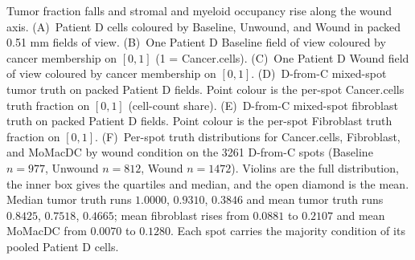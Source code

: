 Tumor fraction falls and stromal and myeloid occupancy rise along the wound axis. (A)~Patient D cells coloured by Baseline, Unwound, and Wound in packed 0.51 mm fields of view. (B)~One Patient D Baseline field of view coloured by cancer membership on \([0,1]\) (1 = Cancer.cells). (C)~One Patient D Wound field of view coloured by cancer membership on \([0,1]\). (D)~D-from-C mixed-spot tumor truth on packed Patient D fields. Point colour is the per-spot Cancer.cells truth fraction on \([0,1]\) (cell-count share). (E)~D-from-C mixed-spot fibroblast truth on packed Patient D fields. Point colour is the per-spot Fibroblast truth fraction on \([0,1]\). (F)~Per-spot truth distributions for Cancer.cells, Fibroblast, and MoMacDC by wound condition on the 3261 D-from-C spots (Baseline \(n=977\), Unwound \(n=812\), Wound \(n=1472\)). Violins are the full distribution, the inner box gives the quartiles and median, and the open diamond is the mean. Median tumor truth runs \(1.0000\), \(0.9310\), \(0.3846\) and mean tumor truth runs \(0.8425\), \(0.7518\), \(0.4665\); mean fibroblast rises from \(0.0881\) to \(0.2107\) and mean MoMacDC from \(0.0070\) to \(0.1280\). Each spot carries the majority condition of its pooled Patient D cells.
